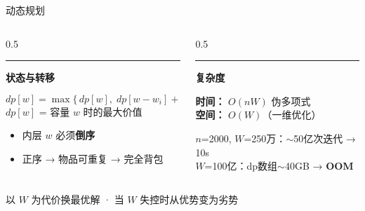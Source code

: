 \documentclass[9pt]{ctexbeamer}
\newenvironment{leftblock}[1]{%
  \vspace{0.3cm}
  \begin{beamercolorbox}[wd=\textwidth,leftskip=0.4cm,rightskip=0.4cm]{}
    \textcolor{ember}{\rule{2.5pt}{0.55cm}}\hspace{0.2cm}
    {\bfseries\color{ink}#1}
    \par\vspace{0.1cm}
    \hspace{0.35cm}\begin{minipage}{\dimexpr\textwidth-1.2cm\relax}
}{%
    \end{minipage}
  \end{beamercolorbox}
  \vspace{0.15cm}
}
\newcommand{\hi}[1]{\textcolor{ember}{\textbf{#1}}}
\begin{document}
\begin{frame}{动态规划}

\begin{columns}[T]
\begin{column}{0.5\textwidth}
\begin{leftblock}{状态与转移}
\[\boxed{dp[w] = \max\{\, dp[w],\; dp[w-w_i] + v_i \,\}}\]
$dp[w]$ = 容量 $w$ 时的最大价值
\end{leftblock}

\vspace{0.1cm}
\begin{itemize}
  \item 内层 $w$ 必须\hi{倒序}
  \item 正序 → 物品可重复 → 完全背包
\end{itemize}
\end{column}

\begin{column}{0.5\textwidth}
\begin{leftblock}{复杂度}
\textbf{时间：} \hi{$O(nW)$} 伪多项式 \\
\textbf{空间：} $O(W)$（一维优化）

\vspace{0.12cm}
{\footnotesize\color{slate}
$n$=2000, $W$=250万：$\sim$50亿次迭代 → 10s \\
$W$=100亿：dp数组$\sim$40GB → \hi{OOM}
}
\end{leftblock}
\end{column}
\end{columns}

\vspace{0.2cm}
\begin{center}
{\small\color{slate}以 $W$ 为代价换最优解 · 当 $W$ 失控时从优势变为劣势}
\end{center}

\end{frame}
\end{document}
